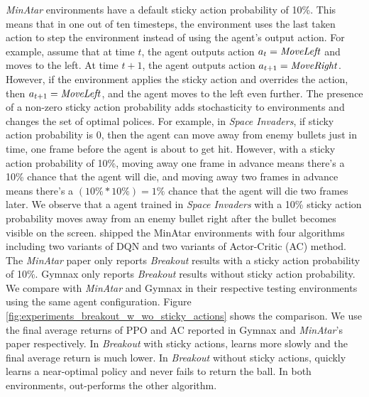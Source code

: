 \textit{MinAtar} environments have a default sticky action probability of 10\%.
This means that in one out of ten timesteps, the environment uses the last taken action to step the environment instead of using the agent's output action.
For example, assume that at time $t$, the agent outputs action $a_t = \text{\textit{MoveLeft}}$ and moves to the left.
At time $t+1$, the agent outputs action $a_{t+1} = \text{\textit{MoveRight}}$.
However, if the environment applies the sticky action and overrides the action, then $a_{t+1} = \text{\textit{MoveLeft}}$, and the agent moves to the left even further.
The presence of a non-zero sticky action probability adds stochasticity to environments and changes the set of optimal polices.
For example, in \textit{Space Invaders}, if sticky action probability is 0, then the agent can move away from enemy bullets just in time, one frame before the agent is about to get hit.
However, with a sticky action probability of 10\%, moving away one frame in advance means there's a 10\% chance that the agent will die, and moving away two frames in advance means there's a $(10\% * 10\%) = 1\%$ chance that the agent will die two frames later.
We observe that a \moozi agent trained in \textit{Space Invaders} with a 10\% sticky action probability moves away from an enemy bullet right after the bullet becomes visible on the screen.
\citeauthor{MinAtarAtariInspiredTestbed_Young.Tian_2019} shipped the MinAtar environments with four algorithms including two variants of DQN and two variants of Actor-Critic (AC) method.
The \textit{MinAtar} paper \cite{MinAtarAtariInspiredTestbed_Young.Tian_2019} only reports \textit{Breakout} results with a sticky action probability of 10\%.
Gymnax only reports \textit{Breakout} results without sticky action probability.
We compare with \textit{MinAtar} and Gymnax in their respective testing environments using the same \moozi agent configuration.
Figure \ref{fig:experiments_breakout_w_wo_sticky_actions} shows the comparison.
We use the final average returns of PPO and AC reported in Gymnax and \textit{MinAtar}'s paper respectively.
In \textit{Breakout} with sticky actions, \moozi learns more slowly and the final average return is much lower.
In \textit{Breakout} without sticky actions, \moozi quickly learns a near-optimal policy and never fails to return the ball.
In both environments, \moozi out-performs the other algorithm.
